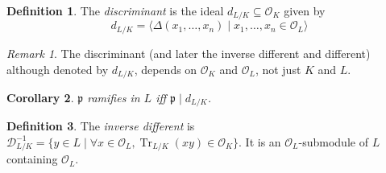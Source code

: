 \documentclass[11pt]{article}
\theoremstyle{definition}
\newtheorem{definition}{Definition}[subsection]
\theoremstyle{plain}
\newtheorem{corollary}[definition]{Corollary}
\theoremstyle{remark}
\newtheorem*{remark}{Remark}
\DeclareMathOperator{\Tr}{Tr}
\newcommand{\cD}{\mathcal{D}}
\newcommand{\cO}{\mathcal{O}}
\newcommand{\fp}{\mathfrak{p}}
\begin{document}
\begin{definition}\label{def:12_3}
    The \emph{discriminant} is the ideal $d_{L / K} \subseteq \cO_K$ given by
    \begin{equation*}
        d_{L/K} = \langle \Delta(x_1, \ldots, x_n) \mid x_1, \ldots, x_n \in \cO_L \rangle
    \end{equation*}
\end{definition}

\begin{remark}
    The discriminant (and later the inverse different and different) although denoted by $d_{L/K}$, depends on $\cO_K$ and $\cO_L$, not just $K$ and $L$.
\end{remark}

\begin{corollary}\label{cor:12_4}
    $\fp$ ramifies in $L$ iff $\fp \mid d_{L/K}$.
\end{corollary}

\begin{definition}\label{def:12_5}
    The \emph{inverse different} is $\cD_{L/K}^{-1} = \{y \in L \mid \forall x \in \cO_L, \Tr_{L/K}(xy) \in \cO_K \}$. It is an $\cO_L$-submodule of $L$ containing $\cO_L$.
\end{definition}
\end{document}
